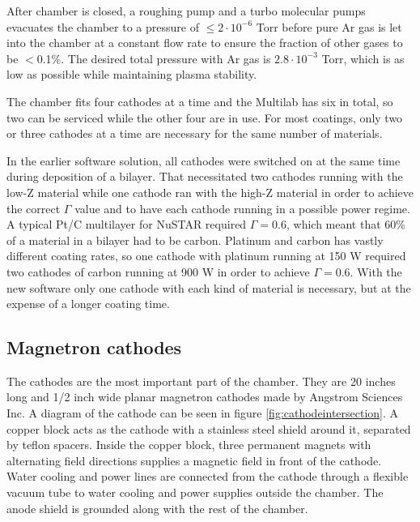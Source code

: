 After chamber is closed, a roughing pump and a turbo molecular pumps evacuates the chamber to a pressure of $\leq2\cdot10^{-6}$ Torr before pure Ar gas is let into the chamber at a constant flow rate to ensure the fraction of other gases to be $<$0.1\%. The desired total pressure with Ar gas is $2.8\cdot10^{-3}$ Torr, which is as low as possible while maintaining plasma stability.

The chamber fits four cathodes at a time and the Multilab has six in total, so two can be serviced while the other four are in use. For most coatings, only two or three cathodes at a time are necessary for the same number of materials.

In the earlier software solution, all cathodes were switched on at the same time during deposition of a bilayer. That necessitated two cathodes running with the low-Z material while one cathode ran with the high-Z material in order to achieve the correct $\Gamma$ value and to have each cathode running in a possible power regime. A typical Pt/C  multilayer for NuSTAR required $\Gamma = 0.6$, which meant that 60\% of a material in a bilayer had to be carbon. Platinum and carbon has vastly different coating rates, so one cathode with platinum running at 150 W required two cathodes of carbon running at 900 W in order to achieve $\Gamma = 0.6$. With the new software only one cathode with each kind of material is necessary, but at the expense of a longer coating time.

\subsection{Magnetron cathodes}
The cathodes are the most important part of the chamber. They are 20 inches long and 1/2 inch wide planar magnetron cathodes made by Angstrom Sciences Inc. A diagram of the cathode can be seen in figure \ref{fig:cathodeintersection}. A copper block acts as the cathode with a stainless steel shield around it, separated by teflon spacers. Inside the copper block, three permanent magnets with alternating field directions supplies a magnetic field in front of the cathode. Water cooling and power lines are connected from the cathode through a flexible vacuum tube to water cooling and power supplies outside the chamber. The anode shield is grounded along with the rest of the chamber.

